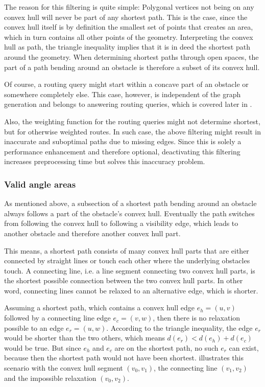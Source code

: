 			The reason for this filtering is quite simple:
			Polygonal vertices not being on any convex hull will never be part of any shortest path.
			This is the case, since the convex hull itself is by definition the smallest set of points that creates an area, which in turn contains all other points of the geometry\cite[2]{de-berg-computational-geometry}.
			Interpreting the convex hull as path, the triangle inequality implies that it is in deed the shortest path around the geometry.
			When determining shortest paths through open spaces, the part of a path bending around an obstacle is therefore a subset of its convex hull.
			
			Of course, a routing query might start within a concave part of an obstacle or somewhere completely else.
			This case, however, is independent of the graph generation and belongs to answering routing queries, which is covered later in .
			
			Also, the weighting function for the routing queries might not determine shortest, but for otherwise weighted routes.
			In such case, the above filtering might result in inaccurate and suboptimal paths due to missing edges.
			Since this is solely a performance enhancement and therefore optional, deactivating this filtering increases preprocessing time but solves this inaccuracy problem.
						
		\subsubsection{Valid angle areas}
		\label{subsubsec:valid-angle-areas}
			
			As mentioned above, a subsection of a shortest path bending around an obstacle always follows a part of the obstacle's convex hull.
			Eventually the path switches from following the convex hull to following a visibility edge, which leads to another obstacle and therefore another convex hull part.
			
			This means, a shortest path consists of many convex hull parts that are either connected by straight lines or touch each other where the underlying obstacles touch.
			A connecting line, i.e. a line segment connecting two convex hull parts, is the shortest possible connection between the two convex hull parts.
			In other word, connecting lines cannot be relaxed to an alternative edge, which is shorter.
			
			Assuming a shortest path, which contains a convex hull edge $e_h=(u, v)$ followed by a connecting line edge $e_c=(v, w)$, then there is no relaxation possible to an edge $e_r=(u, w)$.
			According to the triangle inequality, the edge $e_r$ would be shorter than the two others, which means $d(e_r) < d(e_h) + d(e_c)$ would be true.
			But since $e_h$ and $e_c$ are on the shortest path, no such $e_r$ can exist, because then the shortest path would not have been shortest.
			 illustrates this scenario with the convex hull segment $(v_0, v_1)$, the connecting line $(v_1, v_2)$ and the impossible relaxation $(v_0, v_2)$.
			
